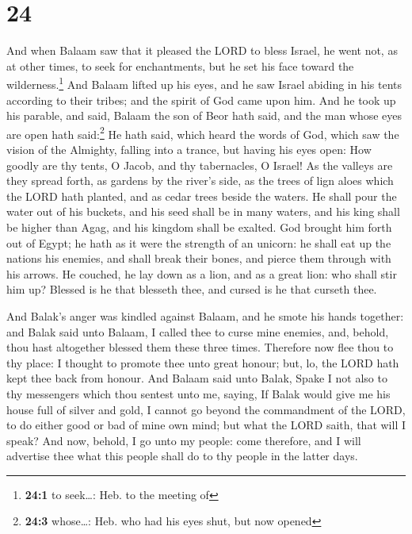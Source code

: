 \hypertarget{section-23}{%
\section{24}\label{section-23}}

 And when Balaam saw that it pleased the LORD to bless
Israel, he went not, as at other times, to seek for enchantments, but he
set his face toward the wilderness.\footnote{\textbf{24:1} to
  seek\ldots: Heb. to the meeting of}  And Balaam lifted
up his eyes, and he saw Israel abiding in his tents according to their
tribes; and the spirit of God came upon him.  And he took
up his parable, and said, Balaam the son of Beor hath said, and the man
whose eyes are open hath said:\footnote{\textbf{24:3} whose\ldots: Heb.
  who had his eyes shut, but now opened}  He hath said,
which heard the words of God, which saw the vision of the Almighty,
falling into a trance, but having his eyes open:  How
goodly are thy tents, O Jacob, and thy tabernacles, O Israel!
 As the valleys are they spread forth, as gardens by the
river's side, as the trees of lign aloes which the LORD hath planted,
and as cedar trees beside the waters.  He shall pour the
water out of his buckets, and his seed shall be in many waters, and his
king shall be higher than Agag, and his kingdom shall be exalted.
 God brought him forth out of Egypt; he hath as it were
the strength of an unicorn: he shall eat up the nations his enemies, and
shall break their bones, and pierce them through with his arrows.
 He couched, he lay down as a lion, and as a great lion:
who shall stir him up? Blessed is he that blesseth thee, and cursed is
he that curseth thee.

 And Balak's anger was kindled against Balaam, and he
smote his hands together: and Balak said unto Balaam, I called thee to
curse mine enemies, and, behold, thou hast altogether blessed them these
three times.  Therefore now flee thou to thy place: I
thought to promote thee unto great honour; but, lo, the LORD hath kept
thee back from honour.  And Balaam said unto Balak, Spake
I not also to thy messengers which thou sentest unto me, saying,
 If Balak would give me his house full of silver and
gold, I cannot go beyond the commandment of the LORD, to do either good
or bad of mine own mind; but what the LORD saith, that will I speak?
 And now, behold, I go unto my people: come therefore,
and I will advertise thee what this people shall do to thy people in the
latter days.

